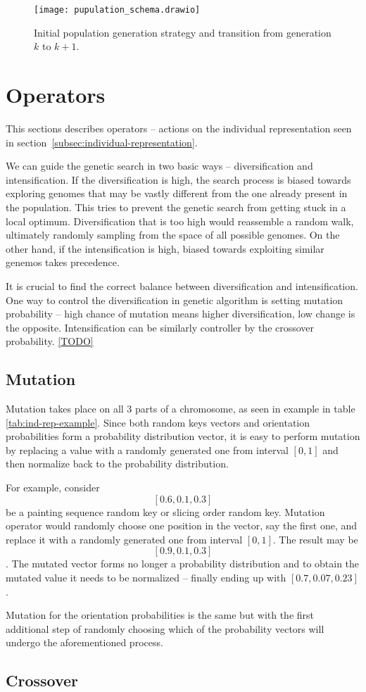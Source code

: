 
\begin{figure}[htp]
    \texttt{[image: pupulation\_schema.drawio]}\label{fig:population-schema}
    \caption{Initial population generation strategy and transition from generation $k$ to $k+1$.}
\end{figure}


\section{Operators}\label{sec:operators}
This sections describes operators – actions on the individual representation
seen in section~\ref{subsec:individual-representation}.

We can guide the genetic search in two basic ways – diversification and intensification.
If the diversification is high, the search process is biased towards exploring genomes
that may be vastly different from the one already present in the population.
This tries to prevent the genetic search from getting stuck in a local optimum.
Diversification that is too high would reassemble a random walk, ultimately randomly sampling
from the space of all possible genomes. On the other hand, if the intensification is high,
biased towards exploiting similar genemos takes precedence.

It is crucial to find the correct balance between diversification and intensification.
One way to control the diversification in genetic algorithm is setting
mutation probability – high chance of mutation means higher diversification, low change is the opposite.
Intensification can be similarly controller by the crossover probability.
\ref{TODO}

\subsection{Mutation}\label{subsec:mutation}
Mutation takes place on all 3 parts of a chromosome, as seen in example in table \ref{tab:ind-rep-example}.
Since both random keys vectors and orientation probabilities form a probability distribution vector,
it is easy to perform mutation by replacing a value with a randomly generated one from interval $[0,1]$
and then normalize back to the probability distribution.

For example, consider $$[0.6, 0.1, 0.3]$$ be a painting sequence random key or slicing order random key.
Mutation operator would randomly choose one position in the vector, say the first one, and replace it
with a randomly generated one from interval $[0,1]$. The result may be $$[0.9, 0.1, 0.3]$$.
The mutated vector forms no longer a probability distribution and to obtain the mutated value
it needs to be normalized – finally ending up with $[0.7, 0.07, 0.23]$.

Mutation for the orientation probabilities is the same but with the first additional
step of randomly choosing which of the probability vectors will undergo the aforementioned process.

\subsection{Crossover}\label{subsec:crossover}


